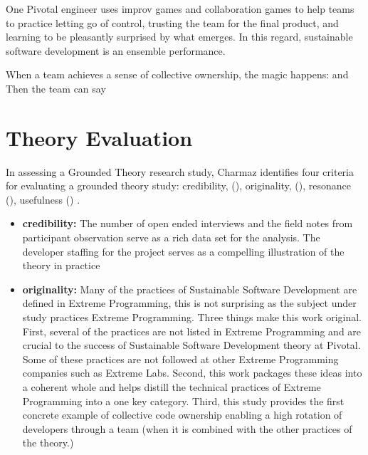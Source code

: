 \begin{table}[]
One Pivotal engineer uses improv games and collaboration games to help teams to practice letting go of control, trusting the team for the final product, and learning to be pleasantly surprised by what emerges. In this regard, sustainable software development is an ensemble performance. 

When a team achieves a sense of collective ownership, the magic happens:  and  Then the team can say 
\section{Theory Evaluation}
\label{TheoryEvaluation}

In assessing a Grounded Theory research study, Charmaz identifies four criteria for evaluating a grounded theory study: credibility, (), originality, (), resonance (), usefulness () \cite{StolGTinSE}. 

\begin{itemize}
\item 
\textbf{credibility:}  The number of open ended interviews and the field notes from participant observation serve as a rich data set for the analysis. The developer staffing for the project serves as a compelling illustration of the theory in practice

\item
\textbf{originality:} Many of the practices of Sustainable Software Development are defined in Extreme Programming, this is not surprising as the subject under study practices Extreme Programming. Three things make this work original. First, several of the practices are not listed in Extreme Programming and are crucial to the success of Sustainable Software Development theory at Pivotal. Some of these practices are not followed at other Extreme Programming companies such as Extreme Labs. Second, this work packages these ideas into a coherent whole and helps distill the technical practices of Extreme Programming into a one key category. Third, this study provides the first concrete example of collective code ownership enabling a high rotation of developers through a team (when it is combined with the other practices of the theory.)


\end{itemize}
\end{table}
